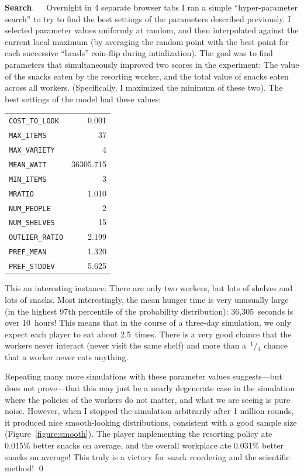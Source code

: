 \documentclass[twocolumn]{article}
\newcommand\sfrac[2]{{}\,$^{#1}$\!/{}\!$_{#2}$}
\begin{document}
\medskip
{\bf Search}.\ \ \ Overnight in 4 separate browser tabs I ran a simple ``hyper-parameter
search'' to try to find the best settings of the parameters described
previously. I selected parameter values uniformly at random, and then
interpolated against the current local maximum (by averaging the
random point with the best point for each successive ``heads''
coin-flip during intialization). The goal was to find parameters that
simultaneously improved two scores in the experiment: The value of the
snacks eaten by the resorting worker, and the total value of snacks
eaten across all workers. (Specifically, I maximized the minimum of
these two). The best settings of the model had these values:

\begin{supertabular}{@{\hspace{0.5in}}lr}
\verb+COST_TO_LOOK+ & 0.001 \\
\verb+MAX_ITEMS+ & 37 \\
\verb+MAX_VARIETY+ & 4 \\
\verb+MEAN_WAIT+ & 36305.715 \\
\verb+MIN_ITEMS+ & 3 \\
\verb+MRATIO+ & 1.010 \\
\verb+NUM_PEOPLE+ & 2 \\
\verb+NUM_SHELVES+ & 15 \\
\verb+OUTLIER_RATIO+ & 2.199 \\
\verb+PREF_MEAN+ & 1.320 \\
\verb+PREF_STDDEV+ & 5.625 \\
\end{supertabular}

This an interesting instance: There are only two workers, but lots of
shelves and lots of snacks. Most interestingly, the mean hunger time is very unusually large (in the highest 97th percentile of the probability distribution): 36,305~seconds is over 10~hours! This means that in the course of a three-day simulation, we only expect each player to eat about 2.5~times. There is a very good chance that the workers never interact (never visit the same shelf) and more than a \sfrac{1}{4} chance that a worker never eats anything.

Repeating many more simulations with these parameter values
suggests---but does not prove---that this may just be a nearly
degenerate case in the simulation where the policies of the workers do
not matter, and what we are seeing is pure noise. However, when I
stopped the simulation arbitrarily after 1 million rounds, it produced
nice smooth-looking distributions, consistent with a good sample size
(Figure~\ref{figure:smooth}). The player implementing the resorting
policy ate 0.015\% better snacks on average, and the overall workplace
ate 0.031\% better snacks on average! This truly is a victory for
snack reordering and the scientific method! \qed
\end{document}
